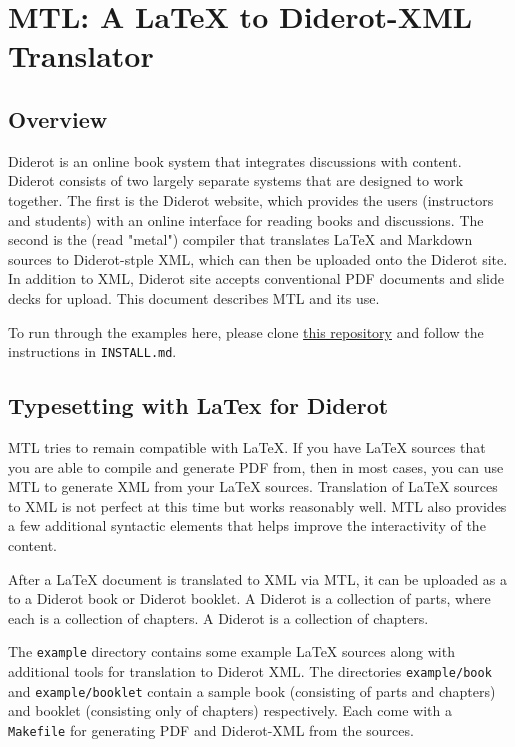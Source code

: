 \chapter{MTL: A LaTeX to Diderot-XML Translator}
\label{mtl}
 

\section{Overview}
Diderot is an online book system that integrates discussions with content.  Diderot consists of two largely separate systems that are designed to work together.  The first is the Diderot website, which provides the users (instructors and students) with an online interface for reading books and discussions.  The second is the  (read "metal") compiler that translates LaTeX and Markdown sources to Diderot-stple XML, which can then be uploaded onto the Diderot site.  In addition to XML, Diderot site accepts conventional PDF documents and slide decks for upload.  This document describes MTL and its use.  


\begin{important}
To run through the examples here, please clone 
%
\href{https://github.com/diderot-edu/guide}{this repository}
%
and follow the instructions in \lstinline`INSTALL.md`. 

\end{important}

\section{Typesetting with LaTex for Diderot}

MTL tries to remain compatible with LaTeX.   If you have  LaTeX sources that you are able to compile and generate PDF from, then in most cases, you can use MTL to generate XML from your LaTeX sources.  Translation of LaTeX sources to XML is not perfect at this time but works reasonably well. MTL also provides a few additional syntactic elements that helps improve the interactivity of the content.  

After a LaTeX document is translated to XML via MTL, it can be uploaded as a  to a Diderot book or Diderot booklet.  
%
A Diderot  is a collection of parts, where each  is a collection of chapters.
%
A Diderot  is a collection of chapters. 
%

The \lstinline`example` directory contains some example LaTeX sources along with additional tools for translation to Diderot XML.
%
The directories \lstinline`example/book` and \lstinline`example/booklet` contain a sample book (consisting of parts and chapters) and booklet (consisting only of chapters) respectively.
%
Each come with a  \lstinline`Makefile` for generating PDF and Diderot-XML from the sources. 
%


